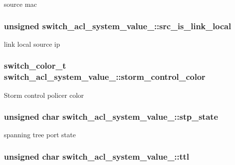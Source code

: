 source mac \hypertarget{unionswitch__acl__system__value___a0c3610d61d7a4f1c9aeb784b7939286c}{
\subsubsection[{src\+\_\+is\+\_\+link\+\_\+local}]{\setlength{\rightskip}{0pt plus 5cm}unsigned switch\+\_\+acl\+\_\+system\+\_\+value\+\_\+\+::src\+\_\+is\+\_\+link\+\_\+local}}\label{unionswitch__acl__system__value___a0c3610d61d7a4f1c9aeb784b7939286c}
link local source ip \hypertarget{unionswitch__acl__system__value___aed370c58db7e6f08487e2bb892f9c0d7}{
\subsubsection[{storm\+\_\+control\+\_\+color}]{\setlength{\rightskip}{0pt plus 5cm}switch\+\_\+color\+\_\+t switch\+\_\+acl\+\_\+system\+\_\+value\+\_\+\+::storm\+\_\+control\+\_\+color}}\label{unionswitch__acl__system__value___aed370c58db7e6f08487e2bb892f9c0d7}
Storm control policer color \hypertarget{unionswitch__acl__system__value___ab1150c9b21d759f7aa7e7fa1b6527fb4}{
\subsubsection[{stp\+\_\+state}]{\setlength{\rightskip}{0pt plus 5cm}unsigned char switch\+\_\+acl\+\_\+system\+\_\+value\+\_\+\+::stp\+\_\+state}}\label{unionswitch__acl__system__value___ab1150c9b21d759f7aa7e7fa1b6527fb4}
spanning tree port state \hypertarget{unionswitch__acl__system__value___a0f7d16f149a8cef677d399b642c1b0b6}{
\subsubsection[{ttl}]{\setlength{\rightskip}{0pt plus 5cm}unsigned char switch\+\_\+acl\+\_\+system\+\_\+value\+\_\+\+::ttl}}\label{unionswitch__acl__system__value___a0f7d16f149a8cef677d399b642c1b0b6}
